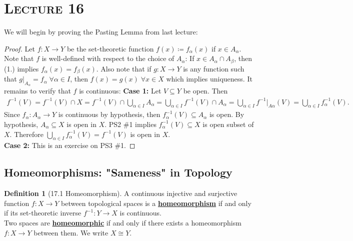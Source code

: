 \documentclass{article}
\newcommand{\wrt}{with respect to}
\newcommand{\Iff}{if and only if}
\newcommand{\coleq}{\ensuremath{\coloneqq}}
\newcommand{\define}[1]{\textbf{\underline{#1}}}
\newcommand{\func}[3]{\ensuremath{#1: #2 \to #3}}
\newcommand{\Union}{\bigcup}
\newcommand{\inter}{\cap}
\renewcommand{\Subset}{\subseteq}
\theoremstyle{definition}
\newtheorem*{defn}{Definition}
\theoremstyle{remark}
\begin{document}
    \noindent\section*{\textbf{\textsc{Lecture 16}}}{
        We will begin by proving the Pasting Lemma from last lecture:
        
        \begin{proof}
            Let $\func{f}{X}{Y}$ be the set-theoretic function $f(x)\coleq f_\alpha (x)$ if $x\in A_\alpha$. Note that $f$ is well-defined \wrt{} the choice of $A_\alpha$: If $x \in A_\alpha \inter A_\beta$, then (1.) implies $f_\alpha(x)=f_\beta(x)$. Also note that if $\func{g}{X}{Y}$ is any function such that $g|_{A_\alpha}=f_\alpha \; \forall \alpha \in I$, then $f(x)=g(x) \; \forall x \in X$ which implies uniqueness. It remains to verify that $f$ is continuous:
            \indent \textbf{Case 1:} Let $V \Subset Y$ be open. Then 
            \begin{align*}
                f^{-1}(V)=f^{-1}(V) \inter X=f^{-1}(V) \inter \Union_{\alpha \in I} A_\alpha=\Union_{\alpha\in I}f^{-1}(V) \inter A_\alpha=\Union_{\alpha \in I}f^{-1}|_{A\alpha}(V)=\Union_{\alpha \in I}f^{-1}_\alpha(V).
            \end{align*}
            Since $\func{f_\alpha}{A_\alpha}{Y}$ is continuous by hypothesis, then $f_\alpha^{-1}(V) \Subset A_\alpha$ is open. By hypothesis, $A_\alpha \Subset X$ is open in $X$. PS2 \#1 implies $f_\alpha^{-1} (V) \Subset X$ is open subset of $X$. Therefore $\Union_{\alpha \in I}f^{-1}_\alpha(V)=f^{-1}(V)$ is open in $X$.\\
            \indent \textbf{Case 2:} This is an exercise on PS3 \#1. 
        \end{proof}
        \subsection*{Homeomorphisms: "Sameness" in Topology}
        
        \begin{defn}[17.1 Homeomorphism]
            A continuous injective and surjective function $\func{f}{X}{Y}$ between topological spaces is a \define{homeomorphism} \Iff{} its set-theoretic inverse $\func{f^{-1}}{Y}{X}$ is continuous.\\
            Two spaces are \define{homeomorphic} \Iff{} there exists a homeomorphism $\func{f}{X}{Y}$ between them. We write $X \cong Y$.
        \end{defn}
        
}
\end{document}
